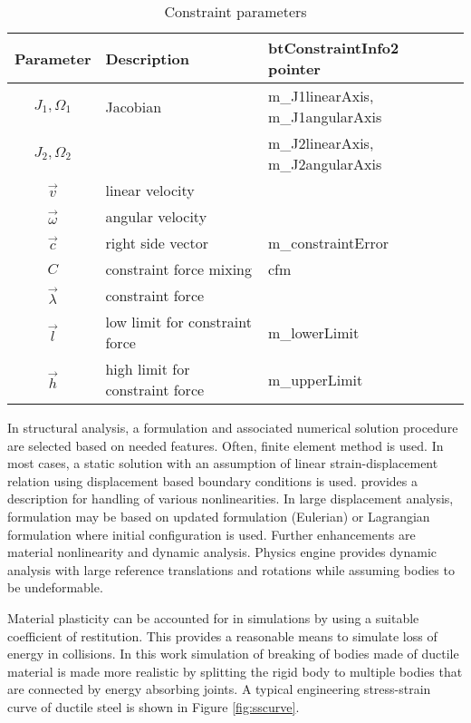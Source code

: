 \begin {table}[htb!]
\caption {Constraint parameters}
\label{tab:constraintParameters} 
\begin{center}
\begin{tabular}{|c| l| l|}
\hline
{\bf Parameter} & {\bf Description} & {\bf btConstraintInfo2 pointer}\\  \hline
$J_1, \Omega_1$ & Jacobian & m\_J1linearAxis, m\_J1angularAxis \\
$J_2, \Omega_2$ & & m\_J2linearAxis, m\_J2angularAxis \\ \hline
$\vec{v}$ & linear velocity & \\ \hline
$\vec{\omega}$ & angular velocity & \\ \hline
$\vec{c}$        &  right side vector   & m\_constraintError \\ \hline
$C$  & constraint force mixing & cfm \\  \hline
$\vec{\lambda}$ & constraint force &  \\ \hline
$\vec{l}$ & low limit for constraint force & m\_lowerLimit \\ \hline
$\vec{h}$ & high limit for constraint force & m\_upperLimit \\ \hline
\end {tabular}
\end{center}
\end {table}


In structural analysis, a formulation and associated numerical solution procedure are selected 
based on needed features.
Often,  finite element method is used.
In most cases, a static solution with an assumption of linear strain-displacement relation
using displacement based boundary conditions is used.
\citet{bathe-1975} provides a description for handling of various nonlinearities.
In large displacement analysis, formulation may be based on updated formulation (Eulerian) or
Lagrangian formulation where initial configuration is used.
Further enhancements are material nonlinearity and dynamic analysis.
Physics engine provides dynamic analysis with large reference translations and rotations
while assuming bodies to be undeformable.

Material plasticity can be accounted for in simulations by using a suitable coefficient of restitution.
This provides a reasonable means to simulate loss of energy in collisions.
In this work simulation of breaking of bodies made of ductile material is made more realistic 
by splitting the rigid body
to multiple bodies that are connected by energy absorbing joints.
A typical engineering stress-strain curve of ductile steel is shown in Figure \ref{fig:sscurve}.

